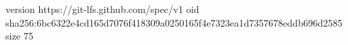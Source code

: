version https://git-lfs.github.com/spec/v1
oid sha256:6bc6322e4cd165d7076f418309a0250165f4e7323ea1d7357678eddb696d2585
size 75
